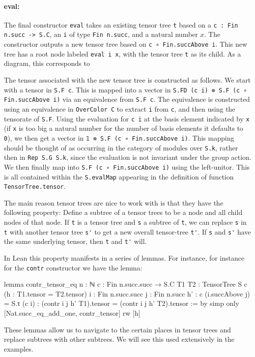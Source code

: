 \documentclass[a4paper, 11pt]{article}
\DeclareRobustCommand{\myinline}{\lstinline}
\newcommand{\tensorTree}[1]{
\begin{center}
  \fcolorbox{mycolor}{white}{%
#1}
\end{center}
}
\begin{document}
\paragraph{eval:}
The final constructor \myinline|eval| takes an existing tensor tree \myinline|t| based on a \myinline|c : Fin n.succ -> S.C|,
an \myinline|i| of type \myinline|Fin n.succ|, and a natural number $x$.  
The constructor outputs a new tensor tree based on \myinline|c ∘ Fin.succAbove i|.
This new tree has a root node labeled \myinline|eval i x|, with the tensor tree \myinline|t| as its child.
As a diagram, this corresponds to 
\tensorTree{
  \begin{tikzpicture}
    \node[draw=black] (A) at (0,0) {\lstinline|eval i x|};
    \node (B) at (0,-1) {\lstinline|t|};
    \draw[->] (A) -- (B);
  \end{tikzpicture} 
}
The tensor associated with the new tensor tree is constructed as follows.
We start with a tensor in \myinline|S.F c|.
This is mapped into a vector in \myinline|S.FD (c i) ⊗ S.F (c ∘ Fin.succAbove i)| via an equivalence from
\myinline|S.F c|. The equivalence is constructed using an equivalence
in \myinline|OverColor C| to extract \myinline|i| from \myinline|c|, and
then using the tensorate of \myinline|S.F|.
Using the evaluation for \myinline|c i| at the basis element indicated by \myinline|x| (if \myinline|x| is too big a natural number for the number of basis elements it defaults to \myinline|0|), we then get a vector in
\myinline|𝟙 ⊗ S.F (c ∘ Fin.succAbove i)|.
This mapping should be thought of as occurring in the  category of modules over \myinline|S.k|, rather then in 
\myinline|Rep S.G S.k|, since the evaluation is not invariant under the group action.
We then finally map into \myinline|S.F (c ∘ Fin.succAbove i)| 
using the left-unitor. This is all contained within the \myinline|S.evalMap| appearing in the definition of
function \myinline|TensorTree.tensor|.

The main reason tensor trees are nice to work with is that they have the following property: 
Define a subtree of a tensor trees 
to be a node and all child nodes of that node. 
If \myinline|t| is a tensor tree and \myinline|s| a subtree of \myinline|t|, we can replace  \myinline|s| in \myinline|t| 
with another tensor tree \myinline|s'|
to get a new overall tensor-tree \myinline|t'|. If \myinline|s| and \myinline|s'| have the same underlying tensor, 
then \myinline|t| and \myinline|t'| will. 

In Lean this property manifests in a series of lemmas. For instance, for instance 
for the \myinline|contr| constructor we have the lemma: 
\begin{code}
lemma contr_tensor_eq {n : ℕ} {c : Fin n.succ.succ → S.C} {T1 T2 : TensorTree S c}
    (h : T1.tensor = T2.tensor) {i : Fin n.succ.succ} {j : Fin n.succ}
    {h' : c (i.succAbove j) = S.τ (c i)} :
    (contr i j h' T1).tensor = (contr i j h' T2).tensor := by
  simp only [Nat.succ_eq_add_one, contr_tensor]
  rw [h]
\end{code}
These lemmas allow us to navigate to the certain places in tensor trees and replace 
subtrees with other subtrees. We will see this used extensively in the examples. 
\end{document}
